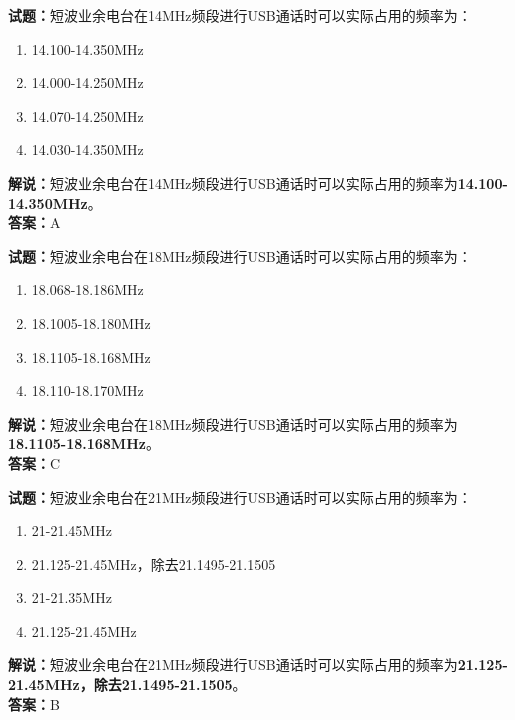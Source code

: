 \documentclass{ctexbook}
\begin{document}
\bigskip




\noindent\textbf{试题：}短波业余电台在14\unit{\MHz}频段进行USB通话时可以实际占用的频率为：
\begin{enumerate}[leftmargin=3em]
\item 14.100-14.350\unit{\MHz}
\item 14.000-14.250\unit{\MHz}
\item 14.070-14.250\unit{\MHz}
\item 14.030-14.350\unit{\MHz}
\end{enumerate}
\noindent\textbf{解说：}短波业余电台在14\unit{\MHz}频段进行USB通话时可以实际占用的频率为\textbf{14.100-14.350\unit{\MHz}}。\\\noindent\textbf{答案：}A

\bigskip




\noindent\textbf{试题：}短波业余电台在18\unit{\MHz}频段进行USB通话时可以实际占用的频率为：
\begin{enumerate}[leftmargin=3em]
\item 18.068-18.186\unit{\MHz}
\item 18.1005-18.180\unit{\MHz}
\item 18.1105-18.168\unit{\MHz}
\item 18.110-18.170\unit{\MHz}
\end{enumerate}
\noindent\textbf{解说：}短波业余电台在18\unit{\MHz}频段进行USB通话时可以实际占用的频率为\textbf{18.1105-18.168\unit{\MHz}}。\\\noindent\textbf{答案：}C

\bigskip




\noindent\textbf{试题：}短波业余电台在21\unit{\MHz}频段进行USB通话时可以实际占用的频率为：
\begin{enumerate}[leftmargin=3em]
\item 21-21.45\unit{\MHz}
\item 21.125-21.45\unit{\MHz}，除去21.1495-21.1505
\item 21-21.35\unit{\MHz}
\item 21.125-21.45\unit{\MHz}
\end{enumerate}
\noindent\textbf{解说：}短波业余电台在21\unit{\MHz}频段进行USB通话时可以实际占用的频率为\textbf{21.125-21.45\unit{\MHz}，除去21.1495-21.1505}。\\\noindent\textbf{答案：}B

\bigskip
\end{document}
